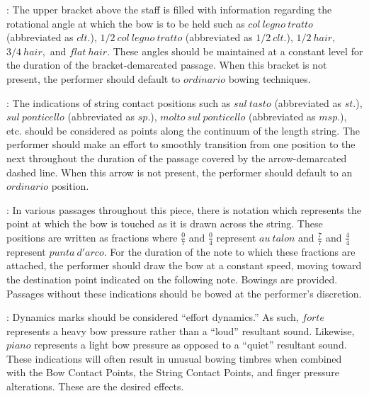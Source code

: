 \documentclass[11pt]{article}
\begin{document}
\begingroup
\begin{center}
 : The upper bracket above the staff is filled with information regarding the rotational angle at which the bow is to be held such as $col \ legno \ tratto$ (abbreviated as $clt.$), $1/2 \ col \ legno \ tratto$ (abbreviated as $1/2 \ clt.$), $1/2 \ hair,$ $3/4 \ hair,$ and $flat \ hair.$ These angles should be maintained at a constant level for the duration of the bracket-demarcated passage. When this bracket is not present, the performer should default to $ordinario$ bowing techniques.
\rightskip\leftskip
\phantom{text} \hfill \phantom{()}

 : The indications of string contact positions such as $sul \ tasto$ (abbreviated as $st.$), $sul \ ponticello$ (abbreviated as $sp.$), $molto \ sul \ ponticello$ (abbreviated as $msp.$), etc. should be considered as points along the continuum of the length string. The performer should make an effort to smoothly transition from one position to the next throughout the duration of the passage covered by the arrow-demarcated dashed line. When this arrow is not present, the performer should default to an $ordinario$ position.
\rightskip\leftskip
\phantom{text} \hfill \phantom{()}

 : In various passages throughout this piece, there is notation which represents the point at which the bow is touched as it is drawn across the string. These positions are written as fractions where \( \frac{0}{7} \) and  \( \frac{0}{4} \) represent $au \ talon$ and \( \frac{7}{7} \) and \( \frac{4}{4} \) represent $punta \ d'arco$. For the duration of the note to which these fractions are attached, the performer should draw the bow at a constant speed, moving toward the destination point indicated on the following note. Bowings are provided. Passages without these indications should be bowed at the performer's discretion.
\rightskip\leftskip
\phantom{text} \hfill \phantom{()}

 : Dynamics marks should be considered ``effort dynamics.'' As such, $forte$ represents a heavy bow pressure rather than a ``loud'' resultant sound. Likewise, $piano$ represents a light bow pressure as opposed to a ``quiet'' resultant sound. These indications will often result in unusual bowing timbres when combined with the Bow Contact Points, the String Contact Points, and finger pressure alterations. These are the desired effects.
\rightskip\leftskip
\phantom{text} \hfill \phantom{()}


\end{center}
\end{document}
